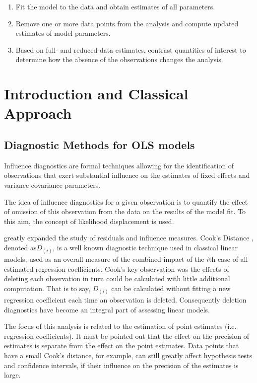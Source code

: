 \documentclass[Main.tex]{subfiles}
\begin{document}
\begin{enumerate}
	\item Fit the model to the data and obtain estimates of all parameters.
	\item Remove one or more data points from the analysis and compute updated estimates of model parameters.
	\item Based on full- and reduced-data estimates, contrast quantities of interest to determine how the absence of the observations changes the analysis.
\end{enumerate}	
	\newpage
	\section{Introduction and Classical Approach}
	\subsection{Diagnostic Methods for OLS models}
	Influence diagnostics are formal techniques allowing for the identification of observations that exert substantial 
	influence on the estimates of fixed effects and variance covariance parameters. 
	
	The idea of influence diagnostics for a given observation is to quantify the effect of omission of this observation 
	from the data on the results of the model fit. To this aim, the concept of likelihood displacement is used. 
	
	

\citet{cook77} greatly expanded the study of residuals and influence measures. Cook's Distance , denoted as$D_{(i)}$, is a well known diagnostic technique used in classical linear models, used as an overall measure of the combined impact of the $i$th case of all estimated regression coefficients. Cook's key observation was the effects of deleting each observation in turn could be calculated with little additional computation. That is to say, $D_{(i)}$ can be calculated without fitting a new regression coefficient each time an observation is deleted.  Consequently deletion diagnostics have become an integral part of assessing linear models. 


The focus of this analysis is related to the estimation of point estimates (i.e. regression coefficients). It must be pointed out that the effect on the precision of estimates is separate from the effect on the point estimates. Data points that
have a small Cook's distance, for example, can still greatly affect hypothesis tests and confidence intervals, if their  influence on the precision of the estimates is large.
\end{document}
